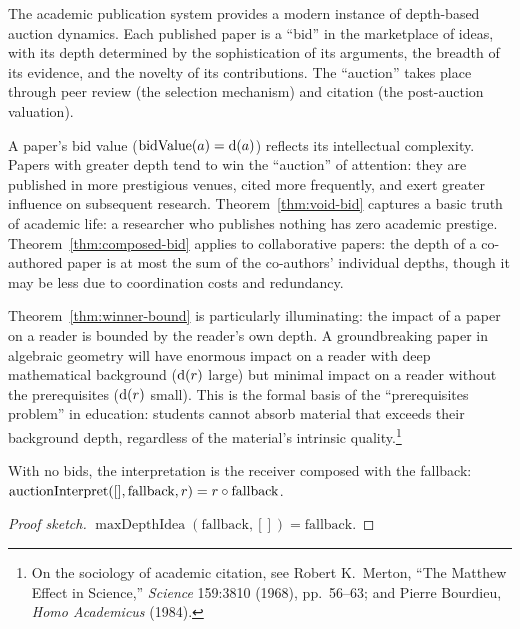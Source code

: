 \begin{example}
\label{ex:citation}
The academic publication system provides a modern instance of depth-based
auction dynamics.  Each published paper is a ``bid'' in the marketplace
of ideas, with its depth determined by the sophistication of its
arguments, the breadth of its evidence, and the novelty of its
contributions.  The ``auction'' takes place through peer review (the
selection mechanism) and citation (the post-auction valuation).

A paper's bid value ($\operatorname{bidValue}(a) = \operatorname{d}(a)$) reflects
its intellectual complexity.  Papers with greater depth tend to win the
``auction'' of attention: they are published in more prestigious venues,
cited more frequently, and exert greater influence on subsequent research.
Theorem~\ref{thm:void-bid} captures a basic truth of academic life: a
researcher who publishes nothing has zero academic prestige.
Theorem~\ref{thm:composed-bid} applies to collaborative papers: the
depth of a co-authored paper is at most the sum of the co-authors'
individual depths, though it may be less due to coordination costs and
redundancy.

Theorem~\ref{thm:winner-bound} is particularly illuminating: the impact
of a paper on a reader is bounded by the reader's own depth.  A
groundbreaking paper in algebraic geometry will have enormous impact on a
reader with deep mathematical background ($\operatorname{d}(r)$ large) but minimal
impact on a reader without the prerequisites ($\operatorname{d}(r)$ small).  This
is the formal basis of the ``prerequisites problem'' in education: students
cannot absorb material that exceeds their background depth, regardless of
the material's intrinsic quality.\footnote{On the sociology of academic
citation, see Robert K.\ Merton, ``The Matthew Effect in Science,''
\textit{Science} 159:3810 (1968), pp.\ 56--63; and Pierre Bourdieu,
\textit{Homo Academicus} (1984).}
\end{example}

\begin{theorem}
\label{thm:empty-interp}
With no bids, the interpretation is the receiver composed with the fallback:
$\operatorname{auctionInterpret}([], \text{fallback}, r) = r \circ \text{fallback}$.
\end{theorem}

\begin{proof}[Proof sketch]
$\operatorname{maxDepthIdea}(\text{fallback}, []) = \text{fallback}$.
\end{proof}

